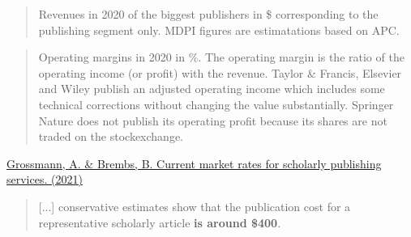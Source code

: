 \documentclass[10pt,compress,serif,aspectratio=169]{beamer}
\begin{document}

\begin{frame}[t]%
 \vskip1cm%
\end{frame}


\begin{frame}[t]%
 \vskip1cm%
 \begin{quote}
   Revenues in 2020 of the biggest publishers in \$ corresponding to the publishing segment only. MDPI figures are estimatations based on APC.
 \end{quote}
\end{frame}


\begin{frame}[t]%
 \vskip1cm%
 \begin{quote}
   \small
Operating margins in 2020 in \%. The operating margin is the ratio of the operating income (or profit) with the revenue. Taylor \& Francis, Elsevier and Wiley publish an adjusted operating income which includes some technical corrections without changing the value substantially. Springer Nature does not publish its operating profit because its shares are not traded on the stockexchange.  
 \end{quote}
\end{frame}

\begin{frame}[t]%
 \vskip1cm%

\href{https://doi.org/10.12688/f1000research.27468.2}{Grossmann, A. \& Brembs, B. Current market rates for scholarly publishing services. (2021)} 
\begin{quote}
  \vspace{.5cm}
   [...] conservative estimates show that the publication cost for a representative scholarly article \textbf{is around \$400}.
 \end{quote}

 \pause
 \vfill
{}
\end{frame}

\end{document}
